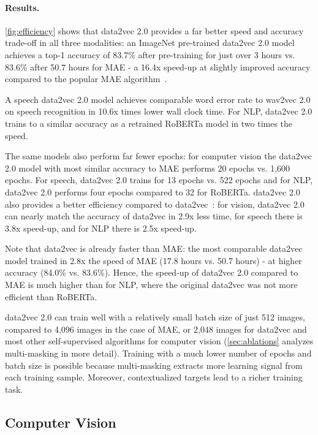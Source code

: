 \documentclass[nohyperref]{article}
\theoremstyle{plain}
\theoremstyle{definition}
\theoremstyle{remark}
\newcommand{\ma}[1]{{\color{orange}#1}}
\renewcommand{\ma}[1]{}
\newcommand{\name}{data2vec 2.0}
\begin{document}
\paragraph{Results.}
\autoref{fig:efficiency} shows that \name{} provides a far better speed and accuracy trade-off in all three modalities: 
an ImageNet pre-trained \name{} model achieves a top-1 accuracy of 83.7\% after pre-training for just over 3 hours vs. 83.6\% after 50.7 hours for MAE - a 16.4x speed-up at slightly improved accuracy compared to the popular MAE algorithm~\citep{he2021mae}.
\ma{This is equivalent to 99 hours on a single A100 GPU, and probably less due to multi-GPU training overhead.}
A speech \name{} model achieves comparable word error rate to wav2vec 2.0 on speech recognition in 10.6x times lower wall clock time.
For NLP, \name{} trains to a similar accuracy as a retrained RoBERTa model in two times the speed. 

The same models also perform far fewer epochs: for computer vision the \name{} model with most similar accuracy to MAE performs 20 epochs vs. 1,600 epochs.
For speech, \name{} trains for 13 epochs vs. 522 epochs and for NLP, \name{} performs four epochs compared to 32 for RoBERTa.
\name{} also provides a better efficiency compared to data2vec~\citep{baevski2022d2v}: for vision, \name{} can nearly match the accuracy of data2vec in 2.9x less time, for speech there is 3.8x speed-up, and for NLP there is 2.5x speed-up.

Note that data2vec is already faster than MAE: 
the most comparable data2vec model trained in 2.8x the speed of MAE (17.8 hours vs. 50.7 hours) - at higher accuracy (84.0\% vs. 83.6\%). 
Hence, the speed-up of \name{} compared to MAE is much higher than for NLP, where the original data2vec was not more efficient than RoBERTa.

\name{} can train well with a relatively small batch size of just 512 images, compared to 4,096 images in the case of MAE, or 2,048 images for data2vec and most other self-supervised algorithms for computer vision (\textsection\ref{sec:ablations} analyzes multi-masking in more detail).
Training with a much lower number of epochs and batch size is possible because multi-masking extracts more learning signal from each training sample.
Moreover, contextualized targets lead to a richer training task.


\subsection{Computer Vision}
\label{sec:cv}
\end{document}
